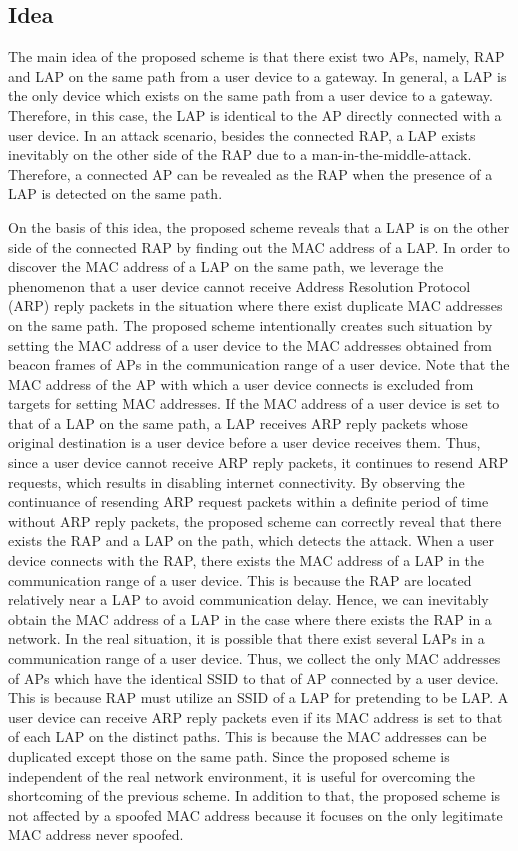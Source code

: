 \documentclass[conference]{IEEEtran}
\begin{document}
\subsection{Idea}
The main idea of the proposed scheme is that there exist two APs, namely, RAP and LAP on the same path from a user device to a gateway.
In general, a LAP is the only device which exists on the same path from a user device to a gateway.
Therefore, in this case, the LAP is identical to the AP directly connected with a user device.
In an attack scenario, besides the connected RAP, a LAP exists inevitably on the other side of the RAP due to a man-in-the-middle-attack.
Therefore, a connected AP can be revealed as the RAP when the presence of a LAP is detected on the same path.

On the basis of this idea, the proposed scheme reveals that a LAP is on the other side of the connected RAP by finding out the MAC address of a LAP.
In order to discover the MAC address of a LAP on the same path, we leverage the phenomenon that a user device cannot receive Address Resolution Protocol (ARP) reply packets in the situation where there exist duplicate MAC addresses on the same path.
The proposed scheme intentionally creates such situation by setting the MAC address of a user device to the MAC addresses obtained from beacon frames of APs in the communication range of a user device.
Note that the MAC address of the AP with which a user device connects is excluded from targets for setting MAC addresses.
If the MAC address of a user device is set to that of a LAP on the same path, a LAP receives ARP reply packets whose original destination is a user device before a user device receives them.
Thus, since a user device cannot receive ARP reply packets, it continues to resend ARP requests, which results in disabling internet connectivity.
By observing the continuance of resending ARP request packets within a definite period of time without ARP reply packets, the proposed scheme can correctly reveal that there exists the RAP and a LAP on the path, which detects the attack.
When a user device connects with the RAP, there exists the MAC address of a LAP in the communication range of a user device.
This is because the RAP are located relatively near a LAP to avoid communication delay.
Hence, we can inevitably obtain the MAC address of a LAP in the case where there exists the RAP in a network.
In the real situation, it is possible that there exist several LAPs in a communication range of a user device.
Thus, we collect the only MAC addresses of APs which have the identical SSID to that of AP connected by a user device.
This is because RAP must utilize an SSID of a LAP for pretending to be LAP.
A user device can receive ARP reply packets even if its MAC address is set to that of each LAP on the distinct paths.
This is because the MAC addresses can be duplicated except those on the same path.
Since the proposed scheme is independent of the real network environment, it is useful for overcoming the shortcoming of the previous scheme.
In addition to that, the proposed scheme is not affected by a spoofed MAC address because it focuses on the only legitimate MAC address never spoofed.
\end{document}
